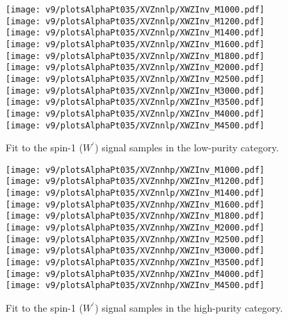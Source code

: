 \begin{figure}[!htb]
  \centering
    \texttt{[image: v9/plotsAlphaPt035/XVZnnlp/XWZInv\_M1000.pdf]}
    \texttt{[image: v9/plotsAlphaPt035/XVZnnlp/XWZInv\_M1200.pdf]}
    \texttt{[image: v9/plotsAlphaPt035/XVZnnlp/XWZInv\_M1400.pdf]}
     \\
    \texttt{[image: v9/plotsAlphaPt035/XVZnnlp/XWZInv\_M1600.pdf]}
    \texttt{[image: v9/plotsAlphaPt035/XVZnnlp/XWZInv\_M1800.pdf]}
    \texttt{[image: v9/plotsAlphaPt035/XVZnnlp/XWZInv\_M2000.pdf]}
     \\
    \texttt{[image: v9/plotsAlphaPt035/XVZnnlp/XWZInv\_M2500.pdf]}
    \texttt{[image: v9/plotsAlphaPt035/XVZnnlp/XWZInv\_M3000.pdf]}
    \texttt{[image: v9/plotsAlphaPt035/XVZnnlp/XWZInv\_M3500.pdf]}
     \\
    \texttt{[image: v9/plotsAlphaPt035/XVZnnlp/XWZInv\_M4000.pdf]}
    \texttt{[image: v9/plotsAlphaPt035/XVZnnlp/XWZInv\_M4500.pdf]}
  \caption{Fit to the spin-1 ($W^{'}$) signal samples in the low-purity category.}
  \label{fig:XWZnnlp_Signal}
\end{figure}


\begin{figure}[!htb]
  \centering
    \texttt{[image: v9/plotsAlphaPt035/XVZnnhp/XWZInv\_M1000.pdf]}
    \texttt{[image: v9/plotsAlphaPt035/XVZnnhp/XWZInv\_M1200.pdf]}
    \texttt{[image: v9/plotsAlphaPt035/XVZnnlp/XWZInv\_M1400.pdf]}
     \\
    \texttt{[image: v9/plotsAlphaPt035/XVZnnhp/XWZInv\_M1600.pdf]}
    \texttt{[image: v9/plotsAlphaPt035/XVZnnhp/XWZInv\_M1800.pdf]}
    \texttt{[image: v9/plotsAlphaPt035/XVZnnhp/XWZInv\_M2000.pdf]}
     \\
    \texttt{[image: v9/plotsAlphaPt035/XVZnnhp/XWZInv\_M2500.pdf]}
    \texttt{[image: v9/plotsAlphaPt035/XVZnnhp/XWZInv\_M3000.pdf]}
    \texttt{[image: v9/plotsAlphaPt035/XVZnnhp/XWZInv\_M3500.pdf]}
     \\
    \texttt{[image: v9/plotsAlphaPt035/XVZnnhp/XWZInv\_M4000.pdf]}
    \texttt{[image: v9/plotsAlphaPt035/XVZnnhp/XWZInv\_M4500.pdf]}
  \caption{Fit to the spin-1 ($W^{'}$) signal samples in the high-purity category.}
  \label{fig:XWZnnhp_Signal}
\end{figure}


